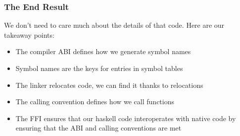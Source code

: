 \documentclass{beamer}
\begin{document}
\begin{frame}
    \frametitle{The End Result}

    We don't need to care much about the details of that code.  Here are our
    takeaway points:

    \begin{itemize}
        \item{The compiler ABI defines how we generate symbol names}
        \item{Symbol names are the keys for entries in symbol tables}
        \item{The linker relocates code, we can find it thanks to relocations}
        \item{The calling convention defines how we call functions}
        \item{The FFI ensures that our haskell code interoperates with native
              code by ensuring that the ABI and calling conventions are met}
    \end{itemize}
\end{frame}
\end{document}
